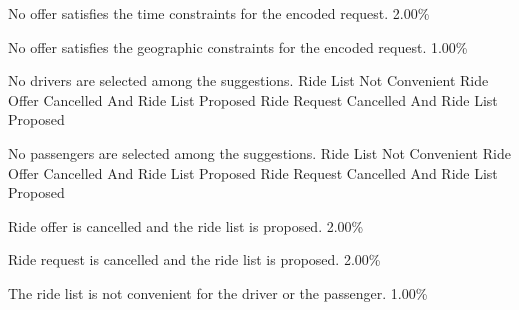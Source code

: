   \startkaosspec
  	 {No offer satisfies the time constraints for the encoded request.}
  	 {2.00\%}
  \stopkaosspec
  
  \startkaosspec
  	 {No offer satisfies the geographic constraints for the encoded request.}
  	 {1.00\%}
  \stopkaosspec

    

    {}

  \startkaosspec
  	 {No drivers are selected among the suggestions.}
  	 {Ride List Not Convenient}
  	 {Ride Offer Cancelled And Ride List Proposed}
  	 {Ride Request Cancelled And Ride List Proposed}
  \stopkaosspec

  \startkaosspec
  	 {No passengers are selected among the suggestions.}
  	 {Ride List Not Convenient}
  	 {Ride Offer Cancelled And Ride List Proposed}
  	 {Ride Request Cancelled And Ride List Proposed}
  \stopkaosspec

  \startkaosspec
  	 {Ride offer is cancelled and the ride list is proposed.}
  	 {2.00\%}
  \stopkaosspec

  \startkaosspec
  	 {Ride request is cancelled and the ride list is proposed.}
  	 {2.00\%}
  \stopkaosspec

  \startkaosspec
  	 {The ride list is not convenient for the driver or the passenger.}
  	 {1.00\%}
  \stopkaosspec
    

    {}

